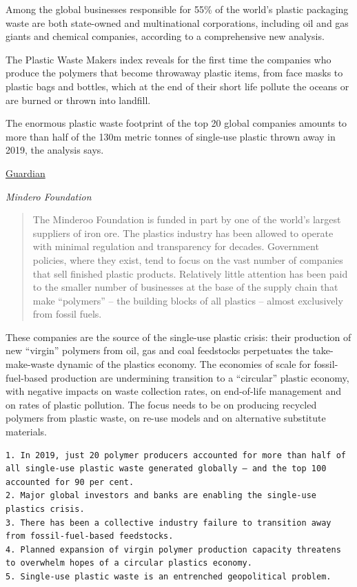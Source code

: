 \documentclass[
]{book}
\begin{document}
Among the global businesses responsible for 55\% of the world's plastic packaging waste are both state-owned and multinational corporations, including oil and gas giants and chemical companies, according to a comprehensive new analysis.

The Plastic Waste Makers index reveals for the first time the companies who produce the polymers that become throwaway plastic items, from face masks to plastic bags and bottles, which at the end of their short life pollute the oceans or are burned or thrown into landfill.

The enormous plastic waste footprint of the top 20 global companies amounts to more than half of the 130m metric tonnes of single-use plastic thrown away in 2019, the analysis says.

\href{https://www.theguardian.com/environment/2021/may/18/twenty-firms-produce-55-of-worlds-plastic-waste-report-reveals}{Guardian}

\emph{Mindero Foundation}

\begin{quote}
The Minderoo Foundation is funded in part by one of the world's largest suppliers of iron ore.
The plastics industry has been allowed to operate with minimal regulation and transparency for decades. Government policies, where they exist, tend to focus on the vast number of companies that sell finished plastic products. Relatively little attention has been paid to the smaller number of businesses at the base of the supply chain that make ``polymers'' -- the building blocks of all plastics -- almost exclusively from fossil fuels.
\end{quote}

These companies are the source of the single-use plastic crisis: their production of new ``virgin'' polymers from oil, gas and coal feedstocks perpetuates the take-make-waste dynamic of the plastics economy. The economies of scale for fossil-fuel-based production are undermining transition to a ``circular'' plastic economy, with negative impacts on waste collection rates, on end-of-life management and on rates of plastic pollution. The focus needs to be on producing recycled polymers from plastic waste, on re-use models and on alternative substitute materials.

\begin{verbatim}
1. In 2019, just 20 polymer producers accounted for more than half of all single-use plastic waste generated globally – and the top 100 accounted for 90 per cent.  
2. Major global investors and banks are enabling the single-use plastics crisis.  
3. There has been a collective industry failure to transition away from fossil-fuel-based feedstocks.  
4. Planned expansion of virgin polymer production capacity threatens to overwhelm hopes of a circular plastics economy.  
5. Single-use plastic waste is an entrenched geopolitical problem.  
\end{verbatim}
\end{document}
